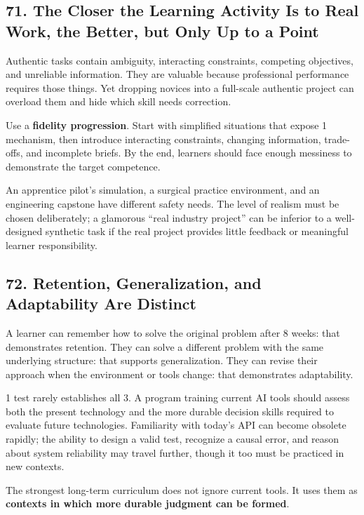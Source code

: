 \subsection*{71. The Closer the Learning Activity Is to Real Work, the Better, but Only Up to a Point}

Authentic tasks contain ambiguity, interacting constraints, competing objectives, and unreliable information. They are valuable because professional performance requires those things. Yet dropping novices into a full-scale authentic project can overload them and hide which skill needs correction.

Use a \textbf{fidelity progression}. Start with simplified situations that expose 1 mechanism, then introduce interacting constraints, changing information, trade-offs, and incomplete briefs. By the end, learners should face enough messiness to demonstrate the target competence.

An apprentice pilot's simulation, a surgical practice environment, and an engineering capstone have different safety needs. The level of realism must be chosen deliberately; a glamorous ``real industry project'' can be inferior to a well-designed synthetic task if the real project provides little feedback or meaningful learner responsibility.

\subsection*{72. Retention, Generalization, and Adaptability Are Distinct}

A learner can remember how to solve the original problem after 8 weeks: that demonstrates retention. They can solve a different problem with the same underlying structure: that supports generalization. They can revise their approach when the environment or tools change: that demonstrates adaptability.

1 test rarely establishes all 3. A program training current AI tools should assess both the present technology and the more durable decision skills required to evaluate future technologies. Familiarity with today's API can become obsolete rapidly; the ability to design a valid test, recognize a causal error, and reason about system reliability may travel further, though it too must be practiced in new contexts.

The strongest long-term curriculum does not ignore current tools. It uses them as \textbf{contexts in which more durable judgment can be formed}.

